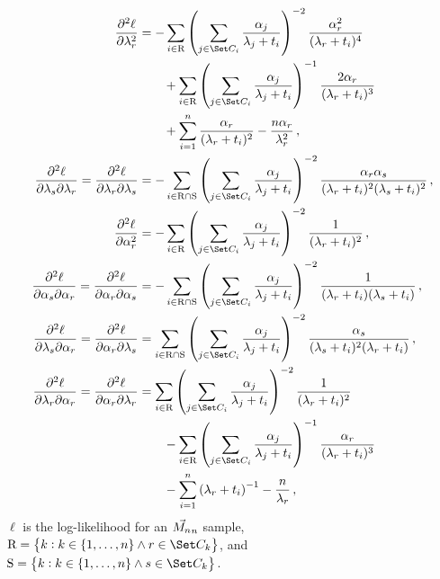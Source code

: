 \documentclass[../main.tex]{subfiles}
\begin{document}
\begin{align}
    \frac{\partial^2 \ell} {\partial \lambda_r^2} &=
        - \sum_{i \in \mathrm{R}}
        \left (
            \sum_{j \in \cand_i} \frac{\alpha_j}{\lambda_j + t_i} 
        \right )^{-2}
        \frac{\alpha_r^2}{(\lambda_r+t_i)^4}\\&\qquad+
        \sum_{i \in \mathrm{R}}
        \left (
            \sum_{j \in \cand_i} \frac{\alpha_j}{\lambda_j + t_i} 
        \right )^{-1}
        \frac{2 \alpha_r}{(\lambda_r+t_i)^3}\\&\qquad+
        \sum_{i=1}^{n} \frac{\alpha_r}{(\lambda_r + t_i)^2} -
        \frac{n \alpha_r}{\lambda_r^2}\,,\\
    \frac{\partial^2 \ell} {\partial \lambda_s \partial \lambda_r} =
        \frac{\partial^2 \ell} {\partial \lambda_r \partial \lambda_s} &=
        -\sum_{i \in \mathrm{R} \cap \mathrm{S}} \left (
        \sum_{j \in \cand_i} \frac{\alpha_j}{\lambda_j + t_i} \right )^{-2}
        \frac{\alpha_r \alpha_s}{(\lambda_r + t_i)^2 (\lambda_s + t_i)^2}\,,\\
    \frac{\partial^2 \ell} {\partial \alpha_r^2} &=
        -\sum_{i \in \mathrm{R}} \left ( \sum_{j \in \cand_i}
        \frac{\alpha_j}{\lambda_j + t_i} \right )^{-2} \frac{1}{(\lambda_r + t_i)^2}\,,\\
    \frac{\partial^2 \ell} {\partial \alpha_s \partial \alpha_r} = \frac{\partial^2 \ell} {\partial \alpha_r \partial \alpha_s} &=
        -\sum_{i \in \mathrm{R} \cap \mathrm{S}} \left ( \sum_{j \in \cand_i}
        \frac{\alpha_j}{\lambda_j + t_i} \right )^{-2} \frac{1}{(\lambda_r + t_i)(\lambda_s + t_i)}\,,\\
    \frac{\partial^2 \ell} {\partial \lambda_s \partial \alpha_r} = \frac{\partial^2 \ell} {\partial \alpha_r \partial \lambda_s} &=
        \sum_{i \in \mathrm{R} \cap \mathrm{S}}
        \left (
            \sum_{j \in \cand_i} \frac{\alpha_j}{\lambda_j + t_i}
        \right )^{-2}
        \frac{\alpha_s}{(\lambda_s + t_i)^2 (\lambda_r + t_i)}\,,\\
    \frac{\partial^2 \ell} {\partial \lambda_r \partial \alpha_r} = \frac{\partial^2 \ell} {\partial \alpha_r \partial \lambda_r} &=
        \sum_{i \in \mathrm{R}}
        \left (
            \sum_{j \in \cand_i} \frac{\alpha_j}{\lambda_j + t_i}
        \right )^{-2}
        \frac{1}{(\lambda_r + t_i)^2}\\&\qquad-
        \sum_{i \in \mathrm{R}}
        \left (
            \sum_{j \in \cand_i} \frac{\alpha_j}{\lambda_j + t_i}
        \right )^{-1}
        \frac{\alpha_r}{(\lambda_r + t_i)^3}\\&\qquad-
        \sum_{i=1}^{n}
        \left (
            {\lambda_r + t_i}
        \right )^{-1} -
        \frac{n}{\lambda_r}\,,
\end{align}
$\ell$ is the log-likelihood for an $\vec{M_n}_n$ sample, $\mathrm{R} = \left \{ k : k \in \{1, \ldots, n \} \wedge r \in \cand_k \right \}$, and $\mathrm{S} = \left \{ k : k \in \{1, \ldots, n \} \wedge s \in \cand_k \right \}$.
\end{document}
